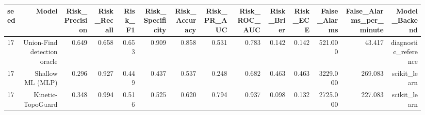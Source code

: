 \begin{tabular}{lrrrrrrrrrrrrr}
\toprule
seed & Model & Risk\_Precision & Risk\_Recall & Risk\_F1 & Risk\_Specificity & Risk\_Accuracy & Risk\_PR\_AUC & Risk\_ROC\_AUC & Risk\_Brier & Risk\_ECE & False\_Alarms & False\_Alarms\_per\_minute & Model\_Backend \\
\midrule
17 & Union-Find detection oracle & 0.649 & 0.658 & 0.653 & 0.909 & 0.858 & 0.531 & 0.783 & 0.142 & 0.142 & 521.000 & 43.417 & diagnostic\_reference \\
17 & Shallow ML (MLP) & 0.296 & 0.927 & 0.449 & 0.437 & 0.537 & 0.248 & 0.682 & 0.463 & 0.463 & 3229.000 & 269.083 & scikit\_learn \\
17 & Kinetic-TopoGuard & 0.348 & 0.994 & 0.516 & 0.525 & 0.620 & 0.794 & 0.937 & 0.098 & 0.132 & 2725.000 & 227.083 & scikit\_learn \\
\bottomrule
\end{tabular}